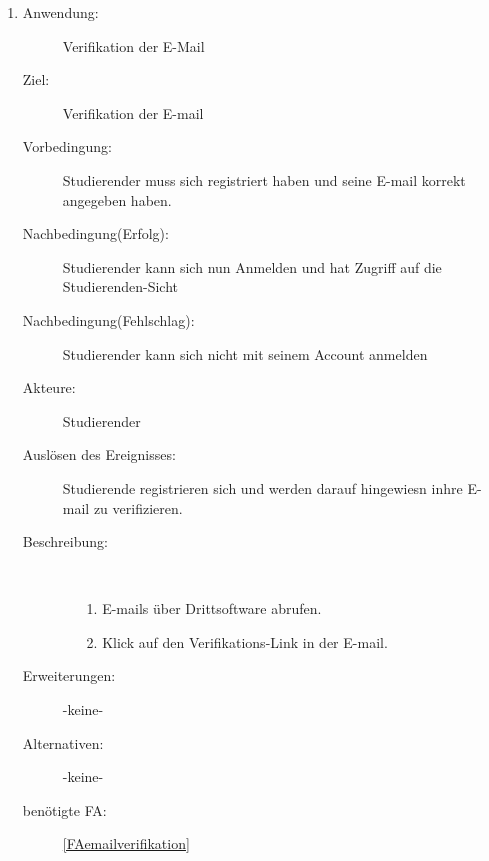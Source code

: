 \documentclass[parskip=full]{scrartcl}
\newcommand{\swtLabel}[1]{\textbf{/#1\arabic*0/}}
\begin{document}
\begin{enumerate}[label=\swtLabel{S}]
  \item
    \begin{description}
    \item[Anwendung:] Verifikation der E-Mail
    \item[Ziel:] Verifikation der E-mail
    \item[Vorbedingung:] Studierender muss sich registriert haben und seine
    E-mail korrekt angegeben haben.
    \item[Nachbedingung(Erfolg):] Studierender kann sich nun Anmelden und hat
    Zugriff auf die Studierenden-Sicht
    \item[Nachbedingung(Fehlschlag):] Studierender kann sich nicht mit seinem
    Account anmelden
    \item[Akteure:] Studierender
    \item[Auslösen des Ereignisses:] Studierende registrieren sich und werden
    darauf hingewiesn inhre E-mail zu verifizieren.
    \item[Beschreibung:]~
    \begin{enumerate}
      \item[1.] E-mails über Drittsoftware abrufen.
      \item[2.] Klick auf den Verifikations-Link in der E-mail.      
    \end{enumerate}
    \item[Erweiterungen:] -keine-
    \item[Alternativen:] -keine-
    \item[benötigte FA:] \ref{FAemailverifikation}
      \end{description}
  

\end{enumerate}
\end{document}
